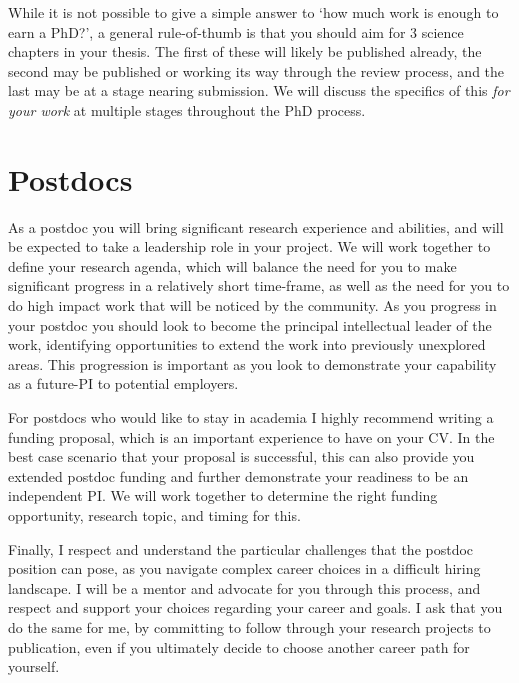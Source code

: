 \documentclass{classassignments}
\begin{document}
While it is not possible to give a simple answer to `how much work is enough to earn a PhD?', a general rule-of-thumb is that you should aim for 3 science chapters in your thesis. The first of these will likely be published already, the second may be published or working its way through the review process, and the last may be at a stage nearing submission. We will discuss the specifics of this \textit{for your work} at multiple stages throughout the PhD process.

\section{Postdocs}
As a postdoc you will bring significant research experience and abilities, and will be expected to take a leadership role in your project. We will work together to define your research agenda, which will balance the need for you to make significant progress in a relatively short time-frame, as well as the need for you to do high impact work that will be noticed by the community. As you progress in your postdoc you should look to become the principal intellectual leader of the work, identifying opportunities to extend the work into previously unexplored areas. This progression is important as you look to demonstrate your capability as a future-PI to potential employers. \medskip

For postdocs who would like to stay in academia I highly recommend writing a funding proposal, which is an important experience to have on your CV. In the best case scenario that your proposal is successful, this can also provide you extended postdoc funding and further demonstrate your readiness to be an independent PI. We will work together to determine the right funding opportunity, research topic, and timing for this.\medskip

Finally, I respect and understand the particular challenges that the postdoc position can pose, as you navigate complex career choices in a difficult hiring landscape. I will be a mentor and advocate for you through this process, and respect and support your choices regarding your career and goals. I ask that you do the same for me, by committing to follow through your research projects to publication, even if you ultimately decide to choose another career path for yourself.
\end{document}
